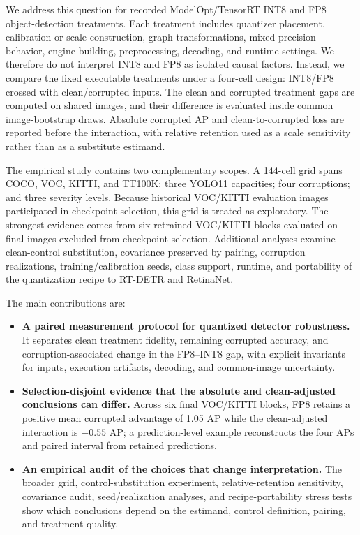 \documentclass[a4paper,fleqn]{cas-dc}
\begin{document}
We address this question for recorded ModelOpt/TensorRT INT8 and FP8 object-detection treatments. Each treatment includes quantizer placement, calibration or scale construction, graph transformations, mixed-precision behavior, engine building, preprocessing, decoding, and runtime settings. We therefore do not interpret INT8 and FP8 as isolated causal factors. Instead, we compare the fixed executable treatments under a four-cell design: INT8/FP8 crossed with clean/corrupted inputs. The clean and corrupted treatment gaps are computed on shared images, and their difference is evaluated inside common image-bootstrap draws. Absolute corrupted AP and clean-to-corrupted loss are reported before the interaction, with relative retention used as a scale sensitivity rather than as a substitute estimand.

The empirical study contains two complementary scopes. A 144-cell grid spans COCO, VOC, KITTI, and TT100K; three YOLO11 capacities; four corruptions; and three severity levels. Because historical VOC/KITTI evaluation images participated in checkpoint selection, this grid is treated as exploratory. The strongest evidence comes from six retrained VOC/KITTI blocks evaluated on final images excluded from checkpoint selection. Additional analyses examine clean-control substitution, covariance preserved by pairing, corruption realizations, training/calibration seeds, class support, runtime, and portability of the quantization recipe to RT-DETR and RetinaNet.

The main contributions are:
\begin{itemize}[leftmargin=1.45em,itemsep=2pt,topsep=3pt,parsep=0pt]
\item \textbf{A paired measurement protocol for quantized detector robustness.} It separates clean treatment fidelity, remaining corrupted accuracy, and corruption-associated change in the FP8--INT8 gap, with explicit invariants for inputs, execution artifacts, decoding, and common-image uncertainty.
\item \textbf{Selection-disjoint evidence that the absolute and clean-adjusted conclusions can differ.} Across six final VOC/KITTI blocks, FP8 retains a positive mean corrupted advantage of 1.05 AP while the clean-adjusted interaction is $-0.55$ AP; a prediction-level example reconstructs the four APs and paired interval from retained predictions.
\item \textbf{An empirical audit of the choices that change interpretation.} The broader grid, control-substitution experiment, relative-retention sensitivity, covariance audit, seed/realization analyses, and recipe-portability stress tests show which conclusions depend on the estimand, control definition, pairing, and treatment quality.
\end{itemize}
\end{document}
